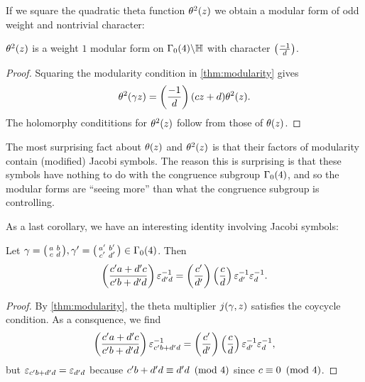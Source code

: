 \documentclass[12pt,reqno,oneside]{amsart}
\begin{document}
    If we square the quadratic theta function $\theta^{2}(z)$ we obtain a modular form of odd weight and nontrivial character:

    \begin{corollary}
        $\theta^{2}(z)$ is a weight $1$ modular form on $\Gamma_{0}(4)\backslash\mathbb{H}$ with character $\textstyle{\left(\frac{-1}{d}\right)}$.
    \end{corollary}
    \begin{proof}
        Squaring the modularity condition in \cref{thm:modularity} gives
        \[
            \theta^{2}(\gamma z) = \left(\frac{-1}{d}\right)(cz+d)\theta^{2}(z).
        \]
        The holomorphy condititions for $\theta^{2}(z)$ follow from those of $\theta(z)$.
    \end{proof}
    
    The most surprising fact about $\theta(z)$ and $\theta^{2}(z)$ is that their factors of modularity contain (modified) Jacobi symbols. The reason this is surprising is that these symbols have nothing to do with the congruence subgroup $\Gamma_{0}(4)$, and so the modular forms are ``seeing more'' than what the congruence subgroup is controlling.
    
    As a last corollary, we have an interesting identity involving Jacobi symbols:

    \begin{corollary}
    Let $\gamma = \begin{psmallmatrix} a & b \\ c & d \end{psmallmatrix},\gamma' = \begin{psmallmatrix} a' & b' \\ c' & d' \end{psmallmatrix} \in \Gamma_{0}(4)$. Then
    \[
        \left(\frac{c'a+d'c}{c'b+d'd}\right)\varepsilon_{d'd}^{-1} = \left(\frac{c'}{d'}\right)\left(\frac{c}{d}\right)\varepsilon_{d'}^{-1}\varepsilon_{d}^{-1}.
    \]
    \end{corollary}
    \begin{proof}
    By \cref{thm:modularity}, the theta multiplier $j(\gamma,z)$ satisfies the coycycle condition. As a consquence, we find
    \[
        \left(\frac{c'a+d'c}{c'b+d'd}\right)\varepsilon_{c'b+d'd}^{-1} = \left(\frac{c'}{d'}\right)\left(\frac{c}{d}\right)\varepsilon_{d'}^{-1}\varepsilon_{d}^{-1},
    \]
    but $\varepsilon_{c'b+d'd} = \varepsilon_{d'd}$ because $c'b+d'd \equiv d'd \ \left(\text{mod }4\right)$ since $c \equiv 0 \ \left(\text{mod }4\right)$.
    \end{proof}
\end{document}
